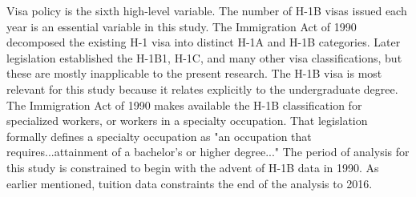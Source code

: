 \documentclass[review]{elsarticle}
\begin{document}
Visa policy is the sixth high-level variable.
The number of H-1B visas issued each year is an essential variable in this study.
The Immigration Act of 1990 decomposed the existing H-1 visa into distinct H-1A and H-1B categories.
Later legislation established the H-1B1, H-1C, and many other visa classifications, but these are mostly inapplicable to the present research.
The H-1B visa is most relevant for this study because it relates explicitly to the undergraduate degree.
The Immigration Act of 1990 makes available the H-1B classification for specialized workers, or workers in a specialty occupation.
That legislation formally defines a specialty occupation as "an occupation that requires...attainment of a bachelor's or higher degree..."
The period of analysis for this study is constrained to begin with the advent of H-1B data in 1990.
As earlier mentioned, tuition data constraints the end of the analysis to 2016.
\end{document}
